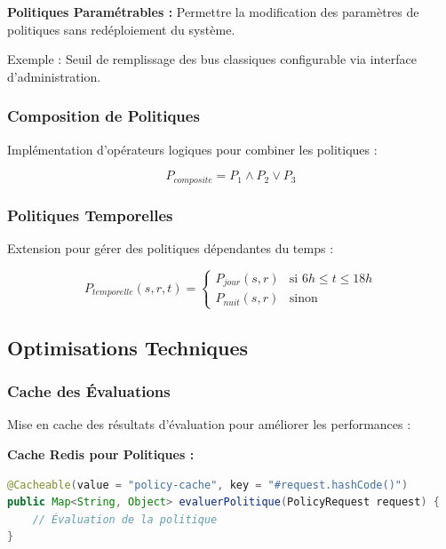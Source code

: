 \documentclass[12pt,a4paper]{article}
\begin{document}
    \begin{definitionbox}
        \textbf{Politiques Paramétrables :} Permettre la modification des paramètres de politiques sans redéploiement du système.

        Exemple : Seuil de remplissage des bus classiques configurable via interface d'administration.
    \end{definitionbox}

    \subsubsection{Composition de Politiques}

    Implémentation d'opérateurs logiques pour combiner les politiques :

    \begin{equation}
        P_{composite} = P_1 \wedge P_2 \vee P_3
    \end{equation}

    \subsubsection{Politiques Temporelles}

    Extension pour gérer des politiques dépendantes du temps :

    \begin{equation}
        P_{temporelle}(s, r, t) = \begin{cases}
                                      P_{jour}(s, r) & \text{si } 6h \leq t \leq 18h \\
                                      P_{nuit}(s, r) & \text{sinon}
        \end{cases}
    \end{equation}

    \subsection{Optimisations Techniques}

    \subsubsection{Cache des Évaluations}

    Mise en cache des résultats d'évaluation pour améliorer les performances :

    \begin{codebox}
        \textbf{Cache Redis pour Politiques :}
        \begin{lstlisting}[language=Java]
@Cacheable(value = "policy-cache", key = "#request.hashCode()")
public Map<String, Object> evaluerPolitique(PolicyRequest request) {
    // Évaluation de la politique
}
        \end{lstlisting}
    \end{codebox}
\end{document}
